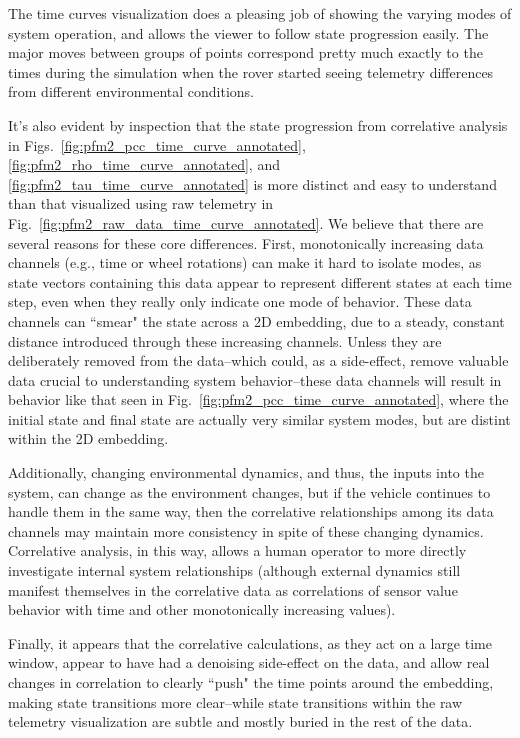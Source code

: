 The time curves visualization does a pleasing job of showing the varying modes of system operation, and allows the viewer to follow state progression easily. The major moves between groups of points correspond pretty much exactly to the times during the simulation when the rover started seeing telemetry differences from different environmental conditions.

It's also evident by inspection that the state progression from correlative analysis in Figs.~\ref{fig:pfm2_pcc_time_curve_annotated}, \ref{fig:pfm2_rho_time_curve_annotated}, and \ref{fig:pfm2_tau_time_curve_annotated} is more distinct and easy to understand than that visualized using raw telemetry in Fig.~\ref{fig:pfm2_raw_data_time_curve_annotated}. We believe that there are several reasons for these core differences. First, monotonically increasing data channels (e.g., time or wheel rotations) can make it hard to isolate modes, as state vectors containing this data appear to represent different states at each time step, even when they really only indicate one mode of behavior. These data channels can ``smear" the state across a 2D embedding, due to a steady, constant distance introduced through these increasing channels. Unless they are deliberately removed from the data--which could, as a side-effect, remove valuable data crucial to understanding system behavior--these data channels will result in behavior like that seen in Fig.~\ref{fig:pfm2_pcc_time_curve_annotated}, where the initial state and final state are actually very similar system modes, but are distint within the 2D embedding.

Additionally, changing environmental dynamics, and thus, the inputs into the system, can change as the environment changes, but if the vehicle continues to handle them in the same way, then the correlative relationships among its data channels may maintain more consistency in spite of these changing dynamics. Correlative analysis, in this way, allows a human operator to more directly investigate internal system relationships (although external dynamics still manifest themselves in the correlative data as correlations of sensor value behavior with time and other monotonically increasing values).

Finally, it appears that the correlative calculations, as they act on a large time window, appear to have had a denoising side-effect on the data, and allow real changes in correlation to clearly ``push" the time points around the embedding, making state transitions more clear--while state transitions within the raw telemetry visualization are subtle and mostly buried in the rest of the data.

